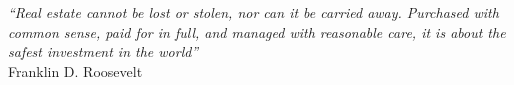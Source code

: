 \cleardoublepage
\thispagestyle{plain}

\vspace*{8cm}

\begin{flushright}
  \textsl{``Real estate cannot be lost or stolen, nor can it be carried away. Purchased with common sense, paid for in full, and managed with reasonable care, it is about the safest investment in the world''} \\
  \vspace*{1.5cm}
  Franklin D. Roosevelt
\end{flushright}
